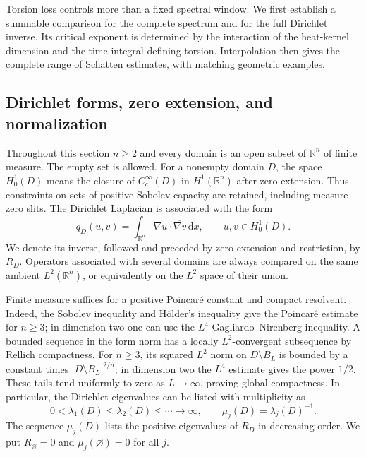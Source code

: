 \documentclass[11pt,reqno]{amsart}
\numberwithin{equation}{section}
\newcommand{\R}{\mathbb R}
\newcommand{\dd}{\,\mathrm d}
\newcommand{\abs}[1]{\lvert#1\rvert}
\begin{document}
Torsion loss controls more than a fixed spectral window.  We first
establish a summable comparison for the complete spectrum and for the
full Dirichlet inverse.  Its critical exponent is determined by the
interaction of the heat-kernel dimension and the time integral defining
torsion.  Interpolation then gives the complete range of Schatten
estimates, with matching geometric examples.

\subsection{Dirichlet forms, zero extension, and normalization}
\label{op:conventions}

Throughout this section $n\ge2$ and every domain is an open subset of
$\R^n$ of finite measure.  The empty set is allowed.  For a nonempty
domain $D$, the space $H_0^1(D)$ means the closure of
$C_c^\infty(D)$ in $H^1(\R^n)$ after zero extension.  Thus constraints
on sets of positive Sobolev capacity are retained, including
measure-zero slits.  The Dirichlet Laplacian is associated with the
form
\[
 q_D(u,v)=\int_{\R^n}\nabla u\cdot\overline{\nabla v}\dd x,
 \qquad u,v\in H_0^1(D).
\]
We denote its inverse, followed and preceded by zero extension and
restriction, by $R_D$.  Operators associated with several domains are
always compared on the same ambient $L^2(\R^n)$, or equivalently on
the $L^2$ space of their union.

Finite measure suffices for a positive Poincar\'e constant and compact
resolvent.  Indeed, the Sobolev inequality and H\"older's inequality
give the Poincar\'e estimate for $n\ge3$; in dimension two one can use
the $L^4$ Gagliardo--Nirenberg inequality.  A bounded sequence in the
form norm has a locally $L^2$-convergent subsequence by Rellich
compactness.  For $n\ge3$, its squared $L^2$ norm on
$D\setminus B_L$ is bounded by a constant times
$\abs{D\setminus B_L}^{2/n}$; in dimension two the $L^4$ estimate
gives the power $1/2$.  These tails tend uniformly to zero as
$L\to\infty$, proving global compactness.  In particular, the
Dirichlet eigenvalues can be listed with multiplicity as
\[
 0<\lambda_1(D)\le\lambda_2(D)\le\cdots\longrightarrow\infty,
 \qquad \mu_j(D)=\lambda_j(D)^{-1}.
\]
The sequence $\mu_j(D)$ lists the positive eigenvalues of $R_D$ in
decreasing order.  We put $R_\varnothing=0$ and
$\mu_j(\varnothing)=0$ for all $j$.
\end{document}
